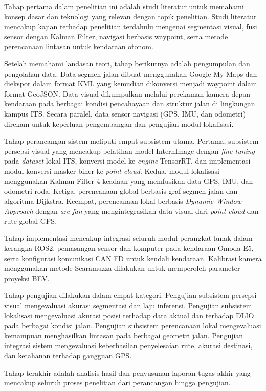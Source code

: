 Tahap pertama dalam penelitian ini adalah studi literatur untuk memahami konsep dasar dan teknologi yang relevan dengan topik penelitian.
Studi literatur mencakup kajian terhadap penelitian terdahulu mengenai segmentasi visual, fusi sensor dengan Kalman Filter, navigasi berbasis waypoint, serta metode perencanaan lintasan untuk kendaraan otonom.

Setelah memahami landasan teori, tahap berikutnya adalah pengumpulan dan pengolahan data.
Data segmen jalan dibuat menggunakan Google My Maps dan diekspor dalam format KML yang kemudian dikonversi menjadi waypoint dalam format GeoJSON.
Data visual dikumpulkan melalui perekaman kamera depan kendaraan pada berbagai kondisi pencahayaan dan struktur jalan di lingkungan kampus ITS.
Secara paralel, data sensor navigasi (GPS, IMU, dan odometri) direkam untuk keperluan pengembangan dan pengujian modul lokalisasi.

Tahap perancangan sistem meliputi empat subsistem utama.
Pertama, subsistem persepsi visual yang mencakup pelatihan model InternImage dengan \emph{fine-tuning} pada \emph{dataset} lokal ITS, konversi model ke \emph{engine} TensorRT, dan implementasi modul konversi masker biner ke \emph{point cloud}.
Kedua, modul lokalisasi menggunakan Kalman Filter 4-keadaan yang memfusikan data GPS, IMU, dan odometri roda.
Ketiga, perencanaan global berbasis graf segmen jalan dan algoritma Dijkstra.
Keempat, perencanaan lokal berbasis \emph{Dynamic Window Approach} dengan \emph{arc fan} yang mengintegrasikan data visual dari \emph{point cloud} dan rute global GPS.

Tahap implementasi mencakup integrasi seluruh modul perangkat lunak dalam kerangka ROS2, pemasangan sensor dan komputer pada kendaraan Omoda E5, serta konfigurasi komunikasi CAN FD untuk kendali kendaraan.
Kalibrasi kamera menggunakan metode Scaramuzza dilakukan untuk memperoleh parameter proyeksi BEV.

Tahap pengujian dilakukan dalam empat kategori.
Pengujian subsistem persepsi visual mengevaluasi akurasi segmentasi dan laju inferensi.
Pengujian subsistem lokalisasi mengevaluasi akurasi posisi terhadap data aktual dan terhadap DLIO pada berbagai kondisi jalan.
Pengujian subsistem perencanaan lokal mengevaluasi kemampuan menghasilkan lintasan pada berbagai geometri jalan.
Pengujian integrasi sistem mengevaluasi keberhasilan penyelesaian rute, akurasi destinasi, dan ketahanan terhadap gangguan GPS.

Tahap terakhir adalah analisis hasil dan penyusunan laporan tugas akhir yang mencakup seluruh proses penelitian dari perancangan hingga pengujian.

